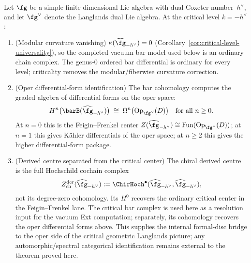 \begin{theorem}
\label{thm:langlands-bar-bridge}
Let $\fg$ be a simple finite-dimensional Lie algebra with dual
Coxeter number~$h^\vee$, and let $\fg^\vee$ denote the Langlands
dual Lie algebra. At the critical level $k = -h^\vee$:
\begin{enumerate}[label=\textup{(\roman*)}]
\item \textup{(Modular curvature vanishing)}\quad
 $\kappa(\widehat{\fg}_{-h^\vee}) = 0$
 \textup{(}Corollary~\textup{\ref{cor:critical-level-universality}}\textup{)},
 so the completed vacuum bar model used below is an ordinary chain
 complex. The genus-$0$ ordered bar differential is ordinary for every
 level; criticality removes the modular/fiberwise curvature correction.
\item \textup{(Oper differential-form identification)}\quad
 The bar cohomology computes the graded algebra of differential forms
 on the oper space:
 \[
 H^n\bigl(\barB(\widehat{\fg}_{-h^\vee})\bigr)
 \;\cong\;
 \Omega^n\bigl(\mathrm{Op}_{\fg^\vee}(D)\bigr)
 \quad\text{for all } n \ge 0.
 \]
 At $n = 0$ this is the Feigin--Frenkel center
 $Z(\widehat{\fg}_{-h^\vee}) \cong
 \mathrm{Fun}(\mathrm{Op}_{\fg^\vee}(D))$;
 at $n = 1$ this gives K\"ahler differentials of the oper space;
 at $n \ge 2$ this gives the higher differential-form package.
\item \textup{(Derived centre separated from the critical center)}\quad
 The chiral derived centre is the full Hochschild cochain complex
 \[
 Z^{\mathrm{der}}_{\mathrm{ch}}(\widehat{\fg}_{-h^\vee})
 :=
 \ChirHoch^\bullet(\widehat{\fg}_{-h^\vee},
 \widehat{\fg}_{-h^\vee}),
 \]
 not its degree-zero cohomology. Its $H^0$ recovers the ordinary
 critical center in the Feigin--Frenkel lane. The critical bar
 complex is used here as a resolution input for the vacuum Ext
 computation; separately, its cohomology recovers the oper
 differential forms above.
 This supplies the internal formal-disc bridge to the oper side of
 the critical geometric Langlands picture; any automorphic/spectral
 categorical identification remains external to the theorem proved
 here.
\end{enumerate}
\end{theorem}

